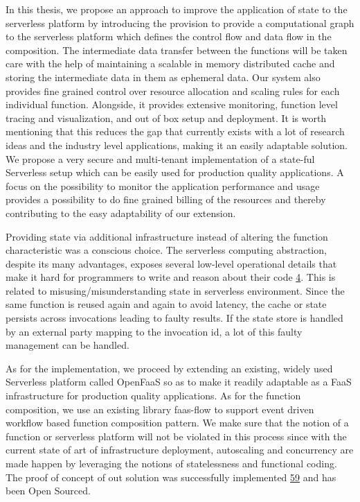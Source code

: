 \documentclass[12pt,titlepage]{article}
\begin{document}
In this thesis, we propose an approach to improve the application of state
to the serverless platform by introducing the provision to provide a
computational graph to the serverless platform which defines the control flow
and data flow in the composition. The intermediate data transfer between the
functions will be taken care with the help of maintaining a scalable in memory
distributed cache and storing the intermediate data in them as ephemeral data.
Our system also provides fine grained control over resource allocation and
scaling rules for each individual function. Alongside, it provides extensive
monitoring, function level tracing and visualization, and out of box setup and
deployment. It is worth mentioning  that this  reduces the gap that currently
exists with a lot of research ideas and the industry level applications, making
it an easily adaptable solution. We propose a very secure and multi-tenant implementation of a
state-ful Serverless setup which can be easily used for production quality
applications. A focus on the possibility to monitor the application performance
and usage provides a possibility to do fine grained billing of the resources and thereby
contributing to the easy adaptability of our extension.

Providing state via additional infrastructure instead of altering the function
characteristic was a conscious choice. The serverless computing abstraction,
despite its many advantages, exposes several low-level operational  details that
make it hard for programmers to write and reason about their code \hyperref[ref:4]{4}. This is
related to misusing/misunderstanding state in serverless environment. Since
the same function is reused again and again to avoid latency, the cache or state
persists across invocations leading to faulty results. If the state store is
handled by an external party mapping to the invocation id, a lot of this faulty
management can be handled.

As for the implementation, we proceed by extending an existing, widely used
Serverless platform called OpenFaaS so as to make it readily adaptable as a FaaS
infrastructure for production quality applications. As for the function
composition, we use an existing library faas-flow to support event driven
workflow based function composition pattern. We make sure that the notion of a
function or serverless platform will not be violated in this process since with
the current state of art of infrastructure deployment, autoscaling and
concurrency are made happen by leveraging the notions of statelessness and
functional coding. The proof of concept of out solution was successfully
implemented \hyperref[ref:59]{59} and has been Open Sourced.
\end{document}
